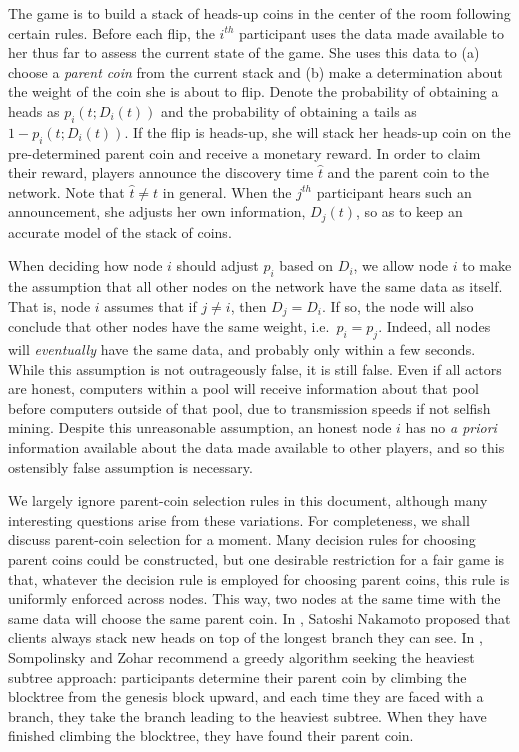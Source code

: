 \documentclass[12pt,english]{mrl}
\theoremstyle{definition}
\numberwithin{equation}{section}
\numberwithin{figure}{section}
\numberwithin{equation}{section}
\numberwithin{equation}{section}
\numberwithin{figure}{section}
\begin{document}
The game is to build a stack of heads-up coins in the center of the room following certain rules. Before each flip, the $i^{th}$ participant uses the data made available to her thus far to assess the current state of the game. She uses this data to (a) choose a \textit{parent coin} from the current stack and (b) make a determination about the weight of the coin she is about to flip. Denote the probability of obtaining a heads as $p_i(t; D_i(t))$ and the probability of obtaining a tails as $1-p_i(t; D_i(t))$. If the flip is heads-up, she will stack her heads-up coin on the pre-determined parent coin and receive a monetary reward. In order to claim their reward, players announce the discovery time $\widehat{t}$ and the parent coin to the network. Note that $\widehat{t} \neq t$ in general. When the $j^{th}$ participant hears such an announcement, she adjusts her own information, $D_j(t)$, so as to keep an accurate model of the stack of coins.

When deciding how node $i$ should adjust $p_i$ based on $D_i$, we allow node $i$ to make the assumption that all other nodes on the network have the same data as itself. That is, node $i$ assumes that if $j \neq i$, then $D_j = D_i$. If so, the node will also conclude that other nodes have the same weight, i.e.\ $p_i = p_j$. Indeed, all nodes will \textit{eventually} have the same data, and probably only within a few seconds. While this assumption is not outrageously false, it is still false. Even if all actors are honest, computers within a pool will receive information about that pool before computers outside of that pool, due to transmission speeds if not selfish mining. Despite this unreasonable assumption, an honest node $i$ has no \textit{a priori} information available about the data made available to other players, and so this ostensibly false assumption is necessary.

We largely ignore parent-coin selection rules in this document, although many interesting questions arise from these variations. For completeness, we shall discuss parent-coin selection for a moment. Many decision rules for choosing parent coins could be constructed, but one desirable restriction for a fair game is that, whatever the decision rule is employed for choosing parent coins, this rule is uniformly enforced across nodes. This way, two nodes at the same time with the same data will choose the same parent coin.  In \cite{nakamoto2008bitcoin}, Satoshi Nakamoto proposed that clients always stack new heads on top of the longest branch they can see. In \cite{sompolinsky2013accelerating}, Sompolinsky and Zohar recommend a greedy algorithm seeking the heaviest subtree approach: participants determine their parent coin by climbing the blocktree from the genesis block upward, and each time they are faced with a branch, they take the branch leading to the heaviest subtree. When they have finished climbing the blocktree, they have found their parent coin. 
\end{document}
